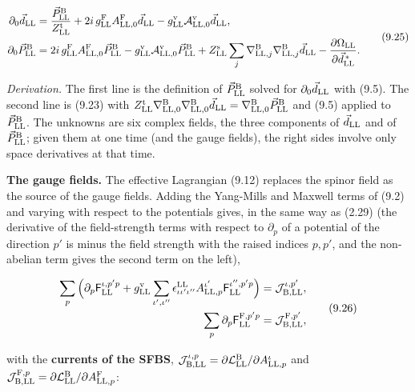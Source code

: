 \documentclass[
  10pt,
]{article}
\begin{document}
\[\begin{aligned}\partial_0\vec d_{\rm LL}&=\frac{\vec P^{\rm B}_{\rm LL}}{Z^{\rm t}_{\rm LL}}+2i\,g^{\rm F}_{\rm LL}A^{\rm F}_{{\rm LL},0}\vec d_{\rm LL}-g^{\rm v}_{\rm LL}\mathcal A^{\rm v}_{{\rm LL},0}\vec d_{\rm LL},\\\partial_0\vec P^{\rm B}_{\rm LL}&=2i\,g^{\rm F}_{\rm LL}A^{\rm F}_{{\rm LL},0}\vec P^{\rm B}_{\rm LL}-g^{\rm v}_{\rm LL}\mathcal A^{\rm v}_{{\rm LL},0}\vec P^{\rm B}_{\rm LL}+Z^{\rm s}_{\rm LL}\sum_j\nabla^{\rm B}_{{\rm LL},j}\nabla^{\rm B}_{{\rm LL},j}\vec d_{\rm LL}-\frac{\partial\Omega_{\rm LL}}{\partial\vec d^{\,*}_{\rm LL}}.\end{aligned}\tag{9.25}\]

\emph{Derivation.} The first line is the definition of
\(\vec P^{\rm B}_{\rm LL}\) solved for \(\partial_0\vec d_{\rm LL}\)
with (9.5). The second line is (9.23) with
\(Z^{\rm t}_{\rm LL}\nabla^{\rm B}_{{\rm LL},0}\nabla^{\rm B}_{{\rm LL},0}\vec d_{\rm LL}=\nabla^{\rm B}_{{\rm LL},0}\vec P^{\rm B}_{\rm LL}\)
and (9.5) applied to \(\vec P^{\rm B}_{\rm LL}\). The unknowns are six
complex fields, the three components of \(\vec d_{\rm LL}\) and of
\(\vec P^{\rm B}_{\rm LL}\); given them at one time (and the gauge
fields), the right sides involve only space derivatives at that time.

\textbf{The gauge fields.} The effective Lagrangian (9.12) replaces the
spinor field as the source of the gauge fields. Adding the Yang-Mills
and Maxwell terms of (9.2) and varying with respect to the potentials
gives, in the same way as (2.29) (the derivative of the field-strength
terms with respect to \(\partial_p\) of a potential of the direction
\(p'\) is minus the field strength with the raised indices \(p,p'\), and
the non-abelian term gives the second term on the left),

\[\begin{aligned}\sum_p\Big(\partial_p\mathsf F^{\iota,p'p}_{\rm LL}+g^{\rm v}_{\rm LL}\sum_{\iota',\iota''}\epsilon^{\rm LL}_{\iota\iota'\iota''}A^{\iota'}_{{\rm LL},p}\mathsf F^{\iota'',p'p}_{\rm LL}\Big)&=\mathcal J^{\iota,p'}_{{\rm B},{\rm LL}},\\\sum_p\partial_p\mathsf F^{{\rm F},p'p}_{\rm LL}&=\mathcal J^{{\rm F},p'}_{{\rm B},{\rm LL}},\end{aligned}\tag{9.26}\]

with the \textbf{currents of the SFBS},
\(\mathcal J^{\iota,p}_{{\rm B},{\rm LL}}=\partial\mathcal L^{\rm B}_{\rm LL}/\partial A^\iota_{{\rm LL},p}\)
and
\(\mathcal J^{{\rm F},p}_{{\rm B},{\rm LL}}=\partial\mathcal L^{\rm B}_{\rm LL}/\partial A^{\rm F}_{{\rm LL},p}\):
\end{document}
